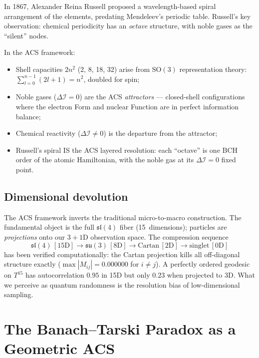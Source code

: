 \documentclass[11pt,a4paper]{article}
\theoremstyle{plain}
\theoremstyle{definition}
\theoremstyle{remark}
\newcommand{\DI}{\Delta\mathcal{I}}
\begin{document}
In 1867, Alexander Reina Russell proposed a wavelength-based spiral
arrangement of the elements, predating Mendeleev's periodic table.
Russell's key observation: chemical periodicity has an \emph{octave}
structure, with noble gases as the ``silent'' nodes.

In the ACS framework:
\begin{itemize}[noitemsep]
  \item Shell capacities $2n^2$ (2, 8, 18, 32) arise from $\mathrm{SO}(3)$
    representation theory: $\sum_{l=0}^{n-1} (2l+1) = n^2$, doubled for spin;
  \item Noble gases ($\DI = 0$) are the ACS \emph{attractors} --- closed-shell
    configurations where the electron Form and nuclear Function are in
    perfect information balance;
  \item Chemical reactivity ($\DI \neq 0$) is the departure from the attractor;
  \item Russell's spiral IS the ACS layered resolution: each ``octave'' is
    one BCH order of the atomic Hamiltonian, with the noble gas at its
    $\DI = 0$ fixed point.
\end{itemize}

\subsection{Dimensional devolution}

The ACS framework inverts the traditional micro-to-macro construction.
The fundamental object is the full $\mathfrak{sl}(4)$ fiber (15~dimensions);
particles are \emph{projections} onto our $3{+}1$D observation space.
The compression sequence
\[
  \mathfrak{sl}(4)\,[15\mathrm{D}] \to \mathfrak{su}(3)\,[8\mathrm{D}]
  \to \mathrm{Cartan}\,[2\mathrm{D}] \to \mathrm{singlet}\,[0\mathrm{D}]
\]
has been verified computationally: the Cartan projection kills all
off-diagonal structure exactly ($\max|M_{ij}| = 0.000000$ for $i \neq j$).
A perfectly ordered geodesic on $T^{15}$ has autocorrelation $0.95$ in 15D
but only $0.23$ when projected to 3D.  What we perceive as quantum
randomness is the resolution bias of low-dimensional sampling.



\section{The Banach--Tarski Paradox as a Geometric ACS}
\label{sec:BT}
\end{document}
